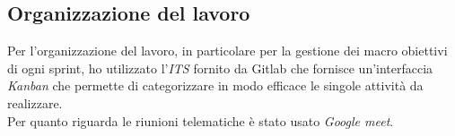 \subsection{Organizzazione del lavoro}
Per l'organizzazione del lavoro, in particolare per la gestione dei macro obiettivi di ogni sprint, ho utilizzato l'\emph{ITS} fornito da Gitlab che fornisce un'interfaccia \emph{Kanban} che permette di categorizzare in modo efficace le singole attività da realizzare. \\
Per quanto riguarda le riunioni telematiche è stato usato \emph{Google meet}.
























